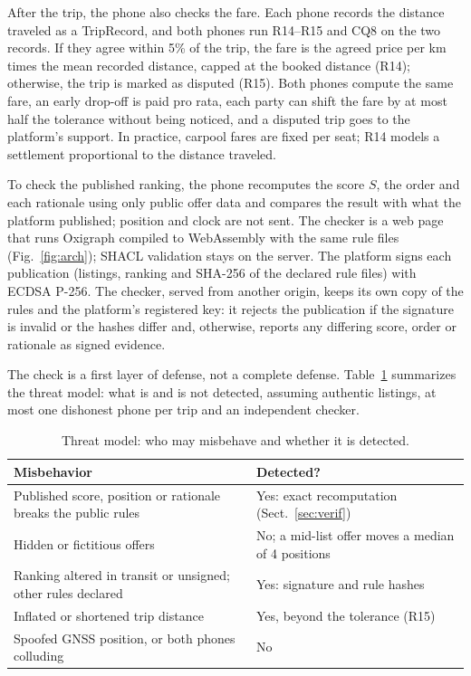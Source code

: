 \documentclass{svproc}
\begin{document}
After the trip, the phone also checks the fare. Each phone records the distance traveled as a \textsf{TripRecord}, and both phones run R14--R15 and CQ8 on the two records. If they agree within 5\% of the trip, the fare is the agreed price per km times the mean recorded distance, capped at the booked distance (R14); otherwise, the trip is marked as disputed (R15). Both phones compute the same fare, an early drop-off is paid pro rata, each party can shift the fare by at most half the tolerance without being noticed, and a disputed trip goes to the platform's support. In practice, carpool fares are fixed per seat; R14 models a settlement proportional to the distance traveled.

To check the published ranking, the phone recomputes the score $S$, the order and each rationale using only public offer data and compares the result with what the platform published; position and clock are not sent. The checker is a web page that runs Oxigraph compiled to WebAssembly with the same rule files (Fig.~\ref{fig:arch}); SHACL validation stays on the server. The platform signs each publication (listings, ranking and SHA-256 of the declared rule files) with ECDSA P-256. The checker, served from another origin, keeps its own copy of the rules and the platform's registered key: it rejects the publication if the signature is invalid or the hashes differ and, otherwise, reports any differing score, order or rationale as signed evidence.

The check is a first layer of defense, not a complete defense. Table~\ref{tab:threat} summarizes the threat model: what is and is not detected, assuming authentic listings, at most one dishonest phone per trip and an independent checker.

\begin{table}[t]
  \caption{Threat model: who may misbehave and whether it is detected.}
  \label{tab:threat}
  \centering\scriptsize
  \begin{tabular}{@{}>{\raggedright}p{5.4cm}>{\raggedright\arraybackslash}p{6.3cm}@{}}
    \toprule
    Misbehavior & Detected? \\
    \midrule
    Published score, position or rationale breaks the public rules & Yes: exact recomputation (Sect.~\ref{sec:verif}) \\
    Hidden or fictitious offers & No; a mid-list offer moves a median of 4 positions \\
    Ranking altered in transit or unsigned; other rules declared & Yes: signature and rule hashes \\
    Inflated or shortened trip distance & Yes, beyond the tolerance (R15) \\
    Spoofed GNSS position, or both phones colluding & No \\
    \bottomrule
  \end{tabular}
\end{table}
\end{document}
